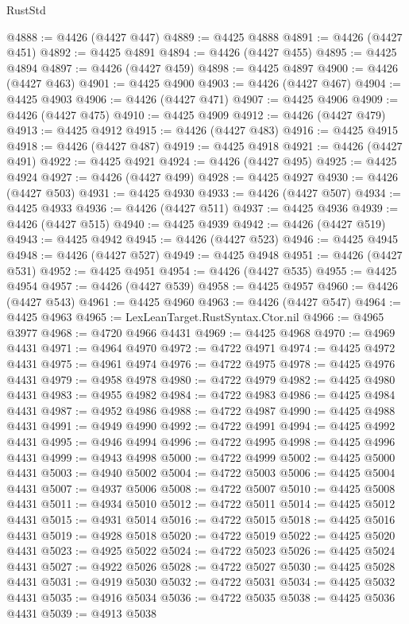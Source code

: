 \begin{lexlean}{RustStd}
\begin{coremodule}
@4888 := @4426 (@4427 @447)
@4889 := @4425 @4888
@4891 := @4426 (@4427 @451)
@4892 := @4425 @4891
@4894 := @4426 (@4427 @455)
@4895 := @4425 @4894
@4897 := @4426 (@4427 @459)
@4898 := @4425 @4897
@4900 := @4426 (@4427 @463)
@4901 := @4425 @4900
@4903 := @4426 (@4427 @467)
@4904 := @4425 @4903
@4906 := @4426 (@4427 @471)
@4907 := @4425 @4906
@4909 := @4426 (@4427 @475)
@4910 := @4425 @4909
@4912 := @4426 (@4427 @479)
@4913 := @4425 @4912
@4915 := @4426 (@4427 @483)
@4916 := @4425 @4915
@4918 := @4426 (@4427 @487)
@4919 := @4425 @4918
@4921 := @4426 (@4427 @491)
@4922 := @4425 @4921
@4924 := @4426 (@4427 @495)
@4925 := @4425 @4924
@4927 := @4426 (@4427 @499)
@4928 := @4425 @4927
@4930 := @4426 (@4427 @503)
@4931 := @4425 @4930
@4933 := @4426 (@4427 @507)
@4934 := @4425 @4933
@4936 := @4426 (@4427 @511)
@4937 := @4425 @4936
@4939 := @4426 (@4427 @515)
@4940 := @4425 @4939
@4942 := @4426 (@4427 @519)
@4943 := @4425 @4942
@4945 := @4426 (@4427 @523)
@4946 := @4425 @4945
@4948 := @4426 (@4427 @527)
@4949 := @4425 @4948
@4951 := @4426 (@4427 @531)
@4952 := @4425 @4951
@4954 := @4426 (@4427 @535)
@4955 := @4425 @4954
@4957 := @4426 (@4427 @539)
@4958 := @4425 @4957
@4960 := @4426 (@4427 @543)
@4961 := @4425 @4960
@4963 := @4426 (@4427 @547)
@4964 := @4425 @4963
@4965 := LexLeanTarget.RustSyntax.Ctor.nil
@4966 := @4965 @3977
@4968 := @4720 @4966 @4431
@4969 := @4425 @4968
@4970 := @4969 @4431
@4971 := @4964 @4970
@4972 := @4722 @4971
@4974 := @4425 @4972 @4431
@4975 := @4961 @4974
@4976 := @4722 @4975
@4978 := @4425 @4976 @4431
@4979 := @4958 @4978
@4980 := @4722 @4979
@4982 := @4425 @4980 @4431
@4983 := @4955 @4982
@4984 := @4722 @4983
@4986 := @4425 @4984 @4431
@4987 := @4952 @4986
@4988 := @4722 @4987
@4990 := @4425 @4988 @4431
@4991 := @4949 @4990
@4992 := @4722 @4991
@4994 := @4425 @4992 @4431
@4995 := @4946 @4994
@4996 := @4722 @4995
@4998 := @4425 @4996 @4431
@4999 := @4943 @4998
@5000 := @4722 @4999
@5002 := @4425 @5000 @4431
@5003 := @4940 @5002
@5004 := @4722 @5003
@5006 := @4425 @5004 @4431
@5007 := @4937 @5006
@5008 := @4722 @5007
@5010 := @4425 @5008 @4431
@5011 := @4934 @5010
@5012 := @4722 @5011
@5014 := @4425 @5012 @4431
@5015 := @4931 @5014
@5016 := @4722 @5015
@5018 := @4425 @5016 @4431
@5019 := @4928 @5018
@5020 := @4722 @5019
@5022 := @4425 @5020 @4431
@5023 := @4925 @5022
@5024 := @4722 @5023
@5026 := @4425 @5024 @4431
@5027 := @4922 @5026
@5028 := @4722 @5027
@5030 := @4425 @5028 @4431
@5031 := @4919 @5030
@5032 := @4722 @5031
@5034 := @4425 @5032 @4431
@5035 := @4916 @5034
@5036 := @4722 @5035
@5038 := @4425 @5036 @4431
@5039 := @4913 @5038

\end{coremodule}
\end{lexlean}
